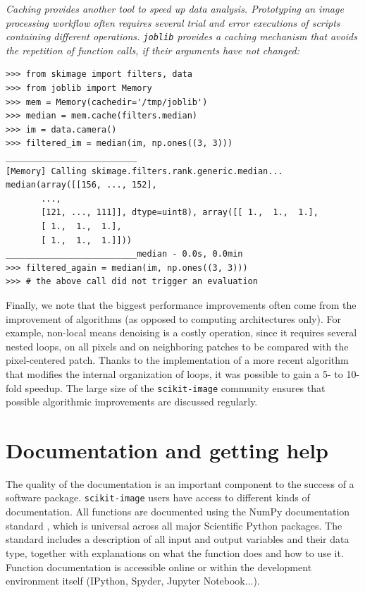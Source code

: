 \documentclass[twocolumn]{bmcart}%
\begin{document}
\em{Caching} provides another tool to speed up data analysis. Prototyping an
image processing workflow often requires several trial and error
executions of scripts containing different operations. \texttt{joblib}
provides a caching mechanism that avoids the repetition of function
calls, if their arguments have not changed:
\begin{lstlisting}
>>> from skimage import filters, data
>>> from joblib import Memory
>>> mem = Memory(cachedir='/tmp/joblib')
>>> median = mem.cache(filters.median)
>>> im = data.camera()
>>> filtered_im = median(im, np.ones((3, 3)))
__________________________
[Memory] Calling skimage.filters.rank.generic.median...
median(array([[156, ..., 152],
       ..., 
       [121, ..., 111]], dtype=uint8), array([[ 1.,  1.,  1.],
       [ 1.,  1.,  1.],
       [ 1.,  1.,  1.]]))
__________________________median - 0.0s, 0.0min
>>> filtered_again = median(im, np.ones((3, 3)))
>>> # the above call did not trigger an evaluation
\end{lstlisting}

Finally, we note that the biggest performance improvements often come from
the improvement of algorithms (as opposed to computing architectures only). For
example, non-local means denoising \citep{Buades2005} is a costly operation,
since it requires several nested loops, on all pixels and on neighboring
patches to be compared with the pixel-centered patch. Thanks to the
implementation of a more recent algorithm \citep{Darbon2008} that modifies the
internal organization of loops, it was possible to gain a 5- to 10-fold speedup.
The large size of the \texttt{scikit-image} community ensures that possible
algorithmic improvements are discussed regularly.

\section*{Documentation and getting help}

The quality of the documentation is an important component to the
success of a software package.
\texttt{scikit-image} users have access to different kinds of
documentation. All functions are
documented using the NumPy documentation standard \citep{Pawlik2015},
which is universal across all major
Scientific Python packages. The standard includes a description of all
input and output variables and their data type, together with
explanations on what the function does and how to use it. Function
documentation is accessible online or within the development
environment itself (IPython, Spyder, Jupyter Notebook...).
\end{document}
